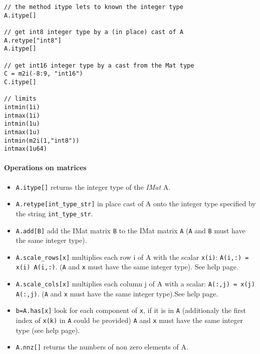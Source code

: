 \begin{mandescription}
\begin{Verbatim}
// the method itype lets to known the integer type
A.itype[]

// get int8 integer type by a (in place) cast of A
A.retype["int8"]
A.itype[]

// get int16 integer type by a cast from the Mat type
C = m2i(-8:9, "int16")
C.itype[]

// limits
intmin(1i)
intmax(1i)
intmin(1u)
intmax(1u)
intmin(m2i(1,"int8"))
intmax(1u64)
\end{Verbatim}


\end{mandescription}

\paragraph{Operations on matrices}


\begin{itemize}
\item \verb+A.itype[]+ returns the integer type of the \emph{IMat} A.
\item \verb+A.retype[int_type_str]+ in place cast of A onto the integer type specified by the string \verb+int_type_str+.
\item \verb+A.add[B]+  add the IMat matrix \verb+B+ to the IMat matrix \verb+A+ (\verb+A+ and \verb+B+ must have
the same  integer type).
\item \verb+A.scale_rows[x]+ multiplies each row i of A with the scalar \verb+x(i)+:
  \verb+A(i,:) = x(i) A(i,:)+.  (\verb+A+ and \verb+x+ must have the same integer type). See  help page.
\item \verb+A.scale_cols[x]+ multiplies each column j of A with a scalar:
  \verb+A(:,j) = x(j) A(:,j)+. (\verb+A+ and \verb+x+ must have the same  integer type).See  help page.
\item \verb+b=A.has[x]+ look for each component of \verb+x+, 
  if it is in \verb+A+ (additionaly the first index of \verb+x(k)+ in \verb+A+ could be provided)
  \verb+A+ and \verb+x+ must have the same  integer type (see  help page).
\item \verb+A.nnz[]+ returns the numbers of non zero elements of A.
\end{itemize}

